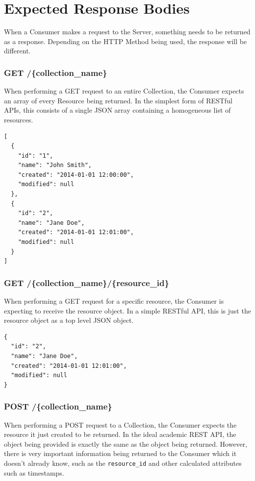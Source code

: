 \documentclass{book}
\begin{document}
\section{Expected Response Bodies}

When a Consumer makes a request to the Server, something needs to be returned as a response. Depending on the HTTP Method being used, the response will be different.

\subsubsection{GET /\{collection\_name\}}

When performing a GET request to an entire Collection, the Consumer expects an array of every Resource being returned. In the simplest form of RESTful APIs, this consists of a single JSON array containing a homogeneous list of resources.

\begin{verbatim}
[
  {
    "id": "1",
    "name": "John Smith",
    "created": "2014-01-01 12:00:00",
    "modified": null
  },
  {
    "id": "2",
    "name": "Jane Doe",
    "created": "2014-01-01 12:01:00",
    "modified": null
  }
]
\end{verbatim}

\subsubsection{GET /\{collection\_name\}/\{resource\_id\}}

When performing a GET request for a specific resource, the Consumer is expecting to receive the resource object. In a simple RESTful API, this is just the resource object as a top level JSON object.

\begin{verbatim}
{
  "id": "2",
  "name": "Jane Doe",
  "created": "2014-01-01 12:01:00",
  "modified": null
}
\end{verbatim}

\subsubsection{POST /\{collection\_name\}}

When performing a POST request to a Collection, the Consumer expects the resource it just created to be returned. In the ideal academic REST API, the object being provided is exactly the same as the object being returned. However, there is very important information being returned to the Consumer which it doesn't already know, such as the \texttt{resource\_id} and other calculated attributes such as timestamps.
\end{document}
